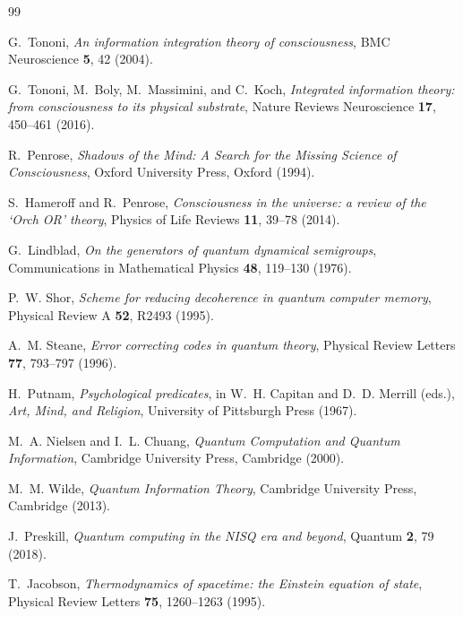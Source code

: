 \documentclass[12pt]{article}
\begin{document}
\begin{thebibliography}{99}

G.~Tononi,
\textit{An information integration theory of consciousness},
BMC Neuroscience \textbf{5}, 42 (2004).

G.~Tononi, M.~Boly, M.~Massimini, and C.~Koch,
\textit{Integrated information theory: from consciousness to its physical
substrate},
Nature Reviews Neuroscience \textbf{17}, 450--461 (2016).

R.~Penrose,
\textit{Shadows of the Mind: A Search for the Missing Science of
Consciousness},
Oxford University Press, Oxford (1994).

S.~Hameroff and R.~Penrose,
\textit{Consciousness in the universe: a review of the `Orch OR' theory},
Physics of Life Reviews \textbf{11}, 39--78 (2014).

G.~Lindblad,
\textit{On the generators of quantum dynamical semigroups},
Communications in Mathematical Physics \textbf{48}, 119--130 (1976).

P.~W. Shor,
\textit{Scheme for reducing decoherence in quantum computer memory},
Physical Review A \textbf{52}, R2493 (1995).

A.~M. Steane,
\textit{Error correcting codes in quantum theory},
Physical Review Letters \textbf{77}, 793--797 (1996).

H.~Putnam,
\textit{Psychological predicates},
in W.~H. Capitan and D.~D. Merrill (eds.),
\textit{Art, Mind, and Religion},
University of Pittsburgh Press (1967).

M.~A. Nielsen and I.~L. Chuang,
\textit{Quantum Computation and Quantum Information},
Cambridge University Press, Cambridge (2000).

M.~M. Wilde,
\textit{Quantum Information Theory},
Cambridge University Press, Cambridge (2013).

J.~Preskill,
\textit{Quantum computing in the NISQ era and beyond},
Quantum \textbf{2}, 79 (2018).

T.~Jacobson,
\textit{Thermodynamics of spacetime: the Einstein equation of state},
Physical Review Letters \textbf{75}, 1260--1263 (1995).


\end{thebibliography}
\end{document}
